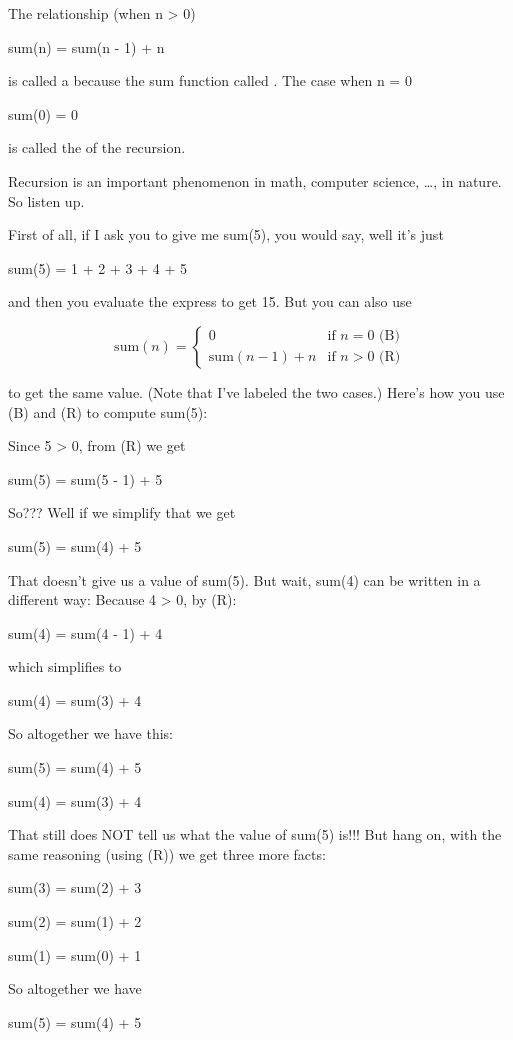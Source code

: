 The relationship (when n > 0)

sum(n) = sum(n - 1) + n

is called a  because the sum function called
. The case when n = 0

sum(0) = 0

is called the  of the recursion.

Recursion is an  important phenomenon in math,
computer science, \ldots, in nature. So listen up.

First of all, if I ask you to give me sum(5), you would say, well it's
just

sum(5) = 1 + 2 + 3 + 4 + 5

and then you evaluate the express to get 15. But you can also use

\[
\text{sum}(n) = \begin{cases}
0 & \text{if } n = 0 \text{ (B)} \\
\text{sum}(n - 1) + n & \text{if } n > 0 \text{ (R)}
\end{cases}
\]

to get the same value. (Note that I've labeled the two cases.) Here's
how you use (B) and (R) to compute sum(5):

Since 5 > 0, from (R) we get

sum(5) = sum(5 - 1) + 5

So??? Well if we simplify that we get

sum(5) = sum(4) + 5

That doesn't give us a value of sum(5). But wait, sum(4)
can be written in a different way: Because 4 > 0, by (R):

sum(4) = sum(4 - 1) + 4

which simplifies to

sum(4) = sum(3) + 4

So altogether we have this:

sum(5) = sum(4) + 5

sum(4) = sum(3) + 4

That still does NOT tell us what the value of sum(5) is!!! But hang on,
with the same reasoning (using (R)) we get three more facts:

sum(3) = sum(2) + 3

sum(2) = sum(1) + 2

sum(1) = sum(0) + 1

So altogether we have

sum(5) = sum(4) + 5

